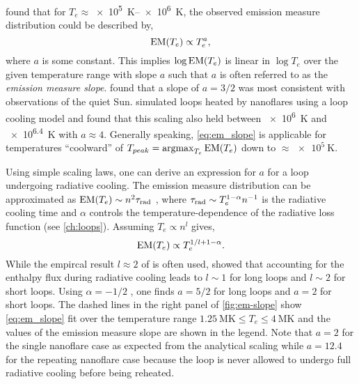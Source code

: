 \citet{jordan_structure_1975,jordan_structure_1976} found that for $T_e\approx$\SIrange{e5}{e6}{\kelvin}, the observed emission measure distribution could be described by,
\begin{equation}\label{eq:em_slope}
    \textup{EM}(T_e) \propto T_e^a,
\end{equation}
where $a$ is some constant. This implies $\log{\textup{EM}(T_e)}$ is linear in $\log{T_e}$ over the given temperature range with slope $a$ such that $a$ is often referred to as the \textit{emission measure slope}. \citet{athay_theoretical_1966,jordan_energy_1980} found that a slope of $a=3/2$ was most consistent with observations of the quiet Sun. \citet{cargill_implications_1994} simulated loops heated by nanoflares using a loop cooling model and found that this scaling also held between \SI{e6}{\kelvin} and \SI{e6.4}{\kelvin} with $a\approx4$. Generally speaking, \autoref{eq:em_slope} is applicable for temperatures ``coolward'' of $T_{peak}=\operatorname*{argmax}_{T_e}\textup{EM}(T_e)$ down to $\approx\SI{e5}{\kelvin}$.

Using simple scaling laws, one can derive an expression for $a$ for a loop undergoing radiative cooling. The emission measure distribution can be approximated as $\textup{EM}(T_e)\sim n^2\tau_\textup{rad}$ \citep{cargill_implications_1994}, where $\tau_\textup{rad}\sim T_e^{1-\alpha}n^{-1}$ is the radiative cooling time and $\alpha$ controls the temperature-dependence of the radiative loss function (see \autoref{ch:loops}). Assuming $T_e\propto n^{l}$ gives,
\begin{equation}
    \textup{EM}(T_e) \propto T_e^{1/l + 1 - \alpha}.
\end{equation}
While the empircal result $l\approx2$ of \citet{serio_dynamics_1991,jakimiec_dynamics_1992} is often used, \citet{bradshaw_cooling_2010} showed that accounting for the enthalpy flux during radiative cooling leads to $l\sim1$ for long loops and $l\sim2$ for short loops. Using $\alpha=-1/2$ \citep[from the scaling laws of][see \autoref{sec:scaling_laws}]{rosner_dynamics_1978}, one finds $a=5/2$ for long loops and $a=2$ for short loops. The dashed lines in the right panel of \autoref{fig:em-slope} show \autoref{eq:em_slope} fit over the temperature range $\SI{1.25}{\mega\kelvin}\le T_e\le\SI{4}{\mega\kelvin}$ and the values of the emission measure slope are shown in the legend. Note that $a=2$ for the single nanoflare case as expected from the analytical scaling while $a=12.4$ for the repeating nanoflare case because the loop is never allowed to undergo full radiative cooling before being reheated. 

